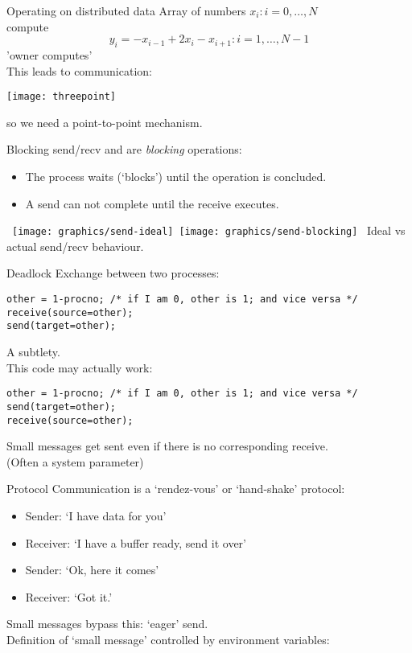 \begin{numberedframe}{Operating on distributed data}
Array of numbers $x_i\colon i=0,\ldots,N$\\
compute \[ y_i= -x_{i-1}+2x_i-x_{i+1} \colon i=1,\ldots,N-1 \]
'owner computes'\\
This leads to communication:

\texttt{[image: threepoint]}

so we need a point-to-point mechanism.
\end{numberedframe}


\begin{numberedframe}{Blocking send/recv}
 and  are \emph{blocking} operations:
\begin{itemize}
\item The process waits (`blocks') until the operation is concluded.
\item A send can not complete until the receive executes.
\end{itemize}
\hbox{
\texttt{[image: graphics/send-ideal]}
\texttt{[image: graphics/send-blocking]}
}
Ideal vs actual send/recv behaviour.
\end{numberedframe}

\begin{numberedframe}{Deadlock}
\lstset{language=C}
Exchange between two processes:
\begin{lstlisting}
other = 1-procno; /* if I am 0, other is 1; and vice versa */
receive(source=other);
send(target=other);
\end{lstlisting}

A subtlety.\\
This code may actually work:
\begin{lstlisting}
other = 1-procno; /* if I am 0, other is 1; and vice versa */
send(target=other);
receive(source=other);
\end{lstlisting}
Small messages get sent even if there is no corresponding receive.\\
(Often a system parameter)
\end{numberedframe}

\begin{numberedframe}{Protocol}
  \label{sl:rendezvous}
Communication is a `rendez-vous' or `hand-shake' protocol:
\begin{itemize}
\item Sender: `I have data for you'
\item Receiver: `I have a buffer ready, send it over'
\item Sender: `Ok, here it comes'
\item Receiver: `Got it.'
\end{itemize}
Small messages bypass this: `eager' send.\\
Definition of `small message' controlled by environment variables:\\
 
\end{numberedframe}

